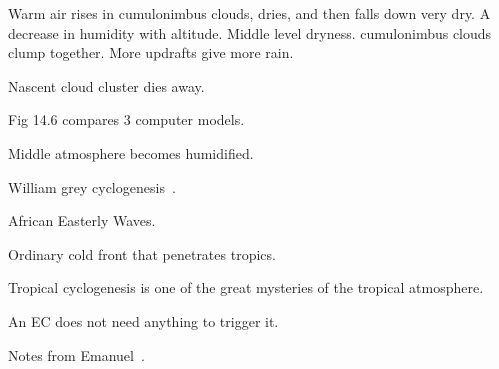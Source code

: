 Warm air rises in cumulonimbus clouds,
 dries, and then falls down very dry.
A decrease in humidity with altitude.
 Middle level dryness.
cumulonimbus clouds clump together.
 More updrafts give more rain.

Nascent cloud cluster dies away.

Fig 14.6 compares 3 computer models.

Middle atmosphere becomes humidified.

William grey cyclogenesis~\cite{gray1975tropical}.

African Easterly Waves.

Ordinary cold front that penetrates tropics.

Tropical cyclogenesis is one of the
 great mysteries of the tropical atmosphere.

An EC does not need anything to trigger it.

Notes from Emanuel~\cite{emanuel2005divine}.
